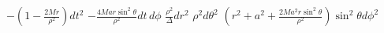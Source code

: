 $- (1 - \frac{2 M r}{\rho^2}) dt^2$
$- \frac{4 M a r \sin^2\theta}{\rho^2} dt\, d\phi$
$\frac{\rho^2}{\Delta} dr^2$
$\rho^2 d\theta^2$
$(r^2 + a^2 + \frac{2 M a^2 r \sin^2\theta}{\rho^2}) \sin^2\theta d\phi^2$

